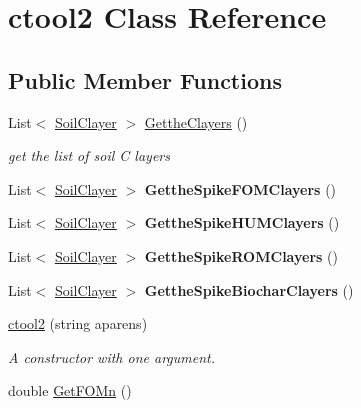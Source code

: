 \hypertarget{classctool2}{}\section{ctool2 Class Reference}
\label{classctool2}
\subsection*{Public Member Functions}
\begin{DoxyCompactItemize}
\item 
\mbox{\label{classctool2_a5a57b763bb7173f222b26f26f08102c0}} 
List$<$ \mbox{\hyperlink{class_soil_clayer}{Soil\+Clayer}} $>$ \mbox{\hyperlink{classctool2_a5a57b763bb7173f222b26f26f08102c0}{Getthe\+Clayers}} ()
\begin{DoxyCompactList}\small\item\em get the list of soil C layers \end{DoxyCompactList}\item 
\mbox{\label{classctool2_a219e077b022c6df25d58e7ec0db1f52c}} 
List$<$ \mbox{\hyperlink{class_soil_clayer}{Soil\+Clayer}} $>$ {\bfseries Getthe\+Spike\+F\+O\+M\+Clayers} ()
\item 
\mbox{\label{classctool2_a719ddfdf8403e5233f03ebf9b8288c71}} 
List$<$ \mbox{\hyperlink{class_soil_clayer}{Soil\+Clayer}} $>$ {\bfseries Getthe\+Spike\+H\+U\+M\+Clayers} ()
\item 
\mbox{\label{classctool2_ac8cf240ea485a4b04d6585e7c4383a33}} 
List$<$ \mbox{\hyperlink{class_soil_clayer}{Soil\+Clayer}} $>$ {\bfseries Getthe\+Spike\+R\+O\+M\+Clayers} ()
\item 
\mbox{\label{classctool2_a4fd7ccfba014dfc2d72b273f1952f937}} 
List$<$ \mbox{\hyperlink{class_soil_clayer}{Soil\+Clayer}} $>$ {\bfseries Getthe\+Spike\+Biochar\+Clayers} ()
\item 
\mbox{\hyperlink{classctool2_ab334aea1ee225ec86031984a2cf87577}{ctool2}} (string aparens)
\begin{DoxyCompactList}\small\item\em A constructor with one argument. \end{DoxyCompactList}\item 
double \mbox{\hyperlink{classctool2_a2b677a56b7667baa7811fef3646d6086}{Get\+F\+O\+Mn}} ()

\end{DoxyCompactItemize}
